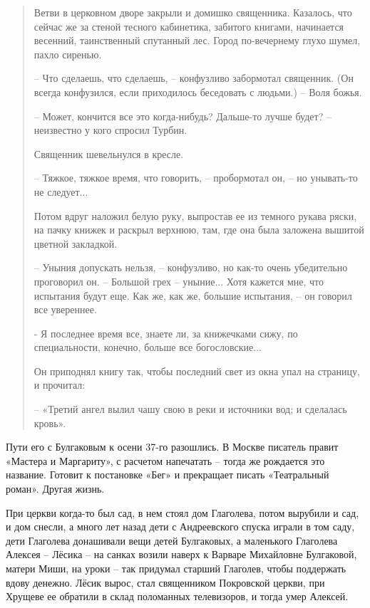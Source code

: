 \begin{quotation}
Ветви в церковном дворе закрыли и домишко священника. Казалось, что сейчас же за стеной тесного кабинетика, забитого  книгами,  начинается  весенний, таинственный спутанный лес. Город по-вечернему глухо шумел, пахло сиренью.

 – Что сделаешь, что сделаешь, – конфузливо  забормотал священник.  (Он всегда конфузился, если приходилось беседовать с людьми.) – Воля божья.

 – Может, кончится  все  это  когда-нибудь?  Дальше-то  лучше  будет?  – неизвестно у кого спросил Турбин.

Священник шевельнулся в кресле.

 – Тяжкое, тяжкое время, что говорить, – пробормотал он, – но унывать-то не следует...

Потом вдруг наложил белую руку, выпростав ее из темного рукава ряски, на пачку книжек и раскрыл верхнюю, там, где она была заложена  вышитой цветной закладкой.

 – Уныния допускать нельзя, – конфузливо, но как-то  очень  убедительно проговорил он. – Большой грех – уныние... Хотя кажется мне, что испытания будут еще. Как же, как же, большие испытания, – он говорил все увереннее.

- Я последнее время все, знаете ли, за книжечками сижу, по специальности, конечно, больше все богословские...

Он приподнял книгу так, чтобы последний свет из окна упал на  страницу, и прочитал:

 – «Третий ангел вылил чашу свою в реки и  источники  вод;  и  сделалась кровь».
\end{quotation}

Пути его с Булгаковым к осени 37-го разошлись. В Москве писатель правит «Мастера и Маргариту», с расчетом напечатать – тогда же рождается это название. Готовит к постановке «Бег» и прекращает писать «Театральный роман». Другая жизнь.

При церкви когда-то был сад, в нем стоял дом Глаголева, потом вырубили и сад, и дом снесли, а много лет назад дети с Андреевского спуска играли в том саду, дети Глаголева донашивали вещи детей Булгаковых, а маленького Глаголева Алексея – Лёсика – на санках возили наверх к Варваре Михайловне Булгаковой, матери Миши, на уроки – так придумал старший Глаголев, чтобы поддержать вдову денежно. Лёсик вырос, стал священником Покровской церкви, при Хрущеве ее обратили в склад поломанных телевизоров, и тогда умер Алексей.

